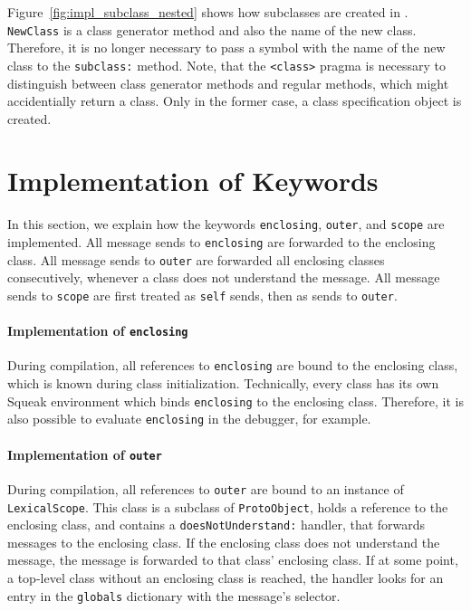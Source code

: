Figure~\ref{fig:impl_subclass_nested} shows how subclasses are created in \msname. \texttt{NewClass} is a class generator method and also the name of the new class. Therefore, it is no longer necessary to pass a symbol with the name of the new class to the \texttt{subclass:} method. Note, that the \texttt{<class>} pragma is necessary to distinguish between class generator methods and regular methods, which might accidentially return a class. Only in the former case, a class specification object is created.

\section{Implementation of Keywords}
\label{sec:impl_keywords}
In this section, we explain how the keywords \texttt{enclosing}, \texttt{outer}, and \texttt{scope} are implemented. All message sends to \texttt{enclosing} are forwarded to the enclosing class. All message sends to \texttt{outer} are forwarded all enclosing classes consecutively, whenever a class does not understand the message. All message sends to \texttt{scope} are first treated as \texttt{self} sends, then as sends to \texttt{outer}.

\paragraph{Implementation of \texttt{enclosing}}
During compilation, all references to \texttt{enclosing} are bound to the enclosing class, which is known during class initialization. Technically, every class has its own Squeak environment which binds \texttt{enclosing} to the enclosing class. Therefore, it is also possible to evaluate \texttt{enclosing} in the debugger, for example.

\paragraph{Implementation of \texttt{outer}}
During compilation, all references to \texttt{outer} are bound to an instance of \texttt{LexicalScope}. This class is a subclass of \texttt{ProtoObject}, holds a reference to the enclosing class, and contains a \texttt{doesNotUnderstand:} handler, that forwards messages to the enclosing class. If the enclosing class does not understand the message, the message is forwarded to that class' enclosing class. If at some point, a top-level class without an enclosing class is reached, the handler looks for an entry in the \texttt{globals} dictionary with the message's selector.


